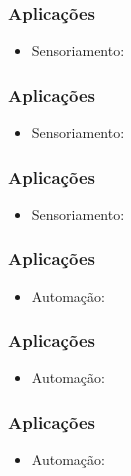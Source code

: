 \documentclass{beamer}
\begin{document}
\begin{frame}
	\frametitle{Aplicações}
	\begin{itemize}
	\item Sensoriamento:
	\end{itemize}
	\begin{center}
	\end{center}
\end{frame}

\begin{frame}
	\frametitle{Aplicações}
	\begin{itemize}
	\item Sensoriamento:
	\end{itemize}
	\begin{center}
	\end{center}
\end{frame}

\begin{frame}
	\frametitle{Aplicações}
	\begin{itemize}
	\item Sensoriamento:
	\end{itemize}
	\begin{center}
	\end{center}
\end{frame}

\begin{frame}
	\frametitle{Aplicações}
	\begin{itemize}
	\item Automação:
	\end{itemize}
	\begin{center}
	\end{center}
\end{frame}

\begin{frame}
	\frametitle{Aplicações}
	\begin{itemize}
	\item Automação:
	\end{itemize}
	\begin{center}
	\end{center}
\end{frame}

\begin{frame}
	\frametitle{Aplicações}
	\begin{itemize}
	\item Automação:
	\end{itemize}
	\begin{center}
	\end{center}
\end{frame}
\end{document}

